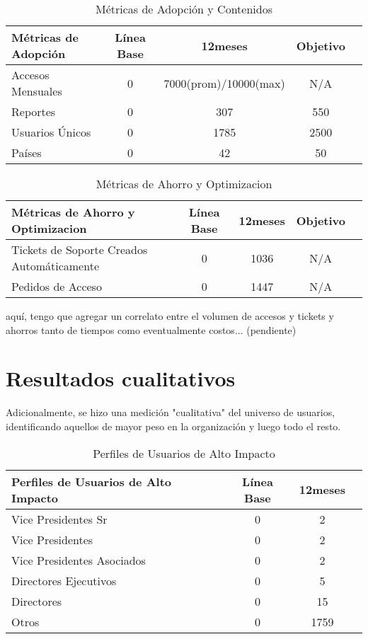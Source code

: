 \begin{table}[h!]
    \centering
    \begin{tabular}{lcccc}
        \hline
        \textbf{Métricas de Adopción} & \textbf{Línea Base} & \textbf{12meses} & \textbf{Objetivo} \\ \hline
        Accesos Mensuales & 0 & 7000(prom)/10000(max) & N/A \\ \hline
        Reportes & 0 & 307 & 550 \\ \hline
        Usuarios Únicos & 0 & 1785 & 2500 \\ \hline
        Países & 0 & 42 & 50 \\ \hline
    \end{tabular}
    \caption{Métricas de Adopción y Contenidos}
    \label{tab:adopcion_contenidos}
\end{table}



\begin{table}[h!]
    \centering
    \begin{tabular}{lcccc}
        \hline
        \textbf{Métricas de Ahorro y Optimizacion} & \textbf{Línea Base} & \textbf{12meses} & \textbf{Objetivo} \\ \hline
        Tickets de Soporte Creados Automáticamente & 0 & 1036 & N/A \\ \hline
        Pedidos de Acceso & 0 & 1447 & N/A \\ \hline
    \end{tabular}
    \caption{Métricas de Ahorro y Optimizacion}
    \label{tab:ahorros_optimizacion}
\end{table}

aquí, tengo que agregar un correlato entre el volumen de accesos y tickets y ahorros tanto de tiempos como eventualmente costos... (pendiente)


\section{Resultados cualitativos}

Adicionalmente, se hizo una medición "cualitativa" del universo de usuarios, identificando aquellos de mayor peso en la organización y luego todo el resto.

\begin{table}[h!]
    \centering
    \begin{tabular}{lccc}
        \hline
        \textbf{Perfiles de Usuarios de Alto Impacto} & \textbf{Línea Base} & \textbf{12meses} \\ \hline
        Vice Presidentes Sr & 0 & 2 \\ \hline
        Vice Presidentes & 0 & 2 \\ \hline
        Vice Presidentes Asociados & 0 & 2 \\ \hline
        Directores Ejecutivos & 0 & 5 \\ \hline
        Directores & 0 & 15 \\ \hline
        Otros & 0 & 1759 \\ \hline
    \end{tabular}
    \caption{Perfiles de Usuarios de Alto Impacto}
    \label{tab:perfiles_alto_impacto}
\end{table}

